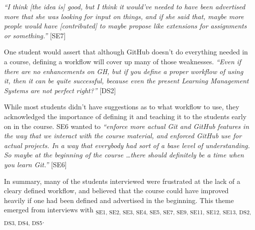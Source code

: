 \textit{``I think [the idea is] good, but I think it would've needed to have been advertised more that she was looking for input on things, and if she said that, maybe more people would have [contributed] to maybe propose like extensions for assignments or something.''} [SE7]

One student would assert that although GitHub doesn't do everything needed in a course, defining a workflow will cover up many of those weaknesses. \textit{``Even if there are no enhancements on GH, but if you define a proper workflow of using it, then it can be quite successful, because even the present Learning Management Systems are not perfect right?''} [DS2]

While most students didn't have suggestions as to what workflow to use, they acknowledged the importance of defining it and teaching it to the students early on in the course. SE6 wanted to \textit{``enforce more actual Git and GitHub features in the way that we interact with the course material, and enforced GitHub use for actual projects. In a way that everybody had sort of a base level of understanding. So maybe at the beginning of the course \ldots there should definitely be a time when you learn Git.''} [SE6]

In summary, many of the students interviewed were frustrated at the lack of a cleary defined workflow, and believed that the course could have improved heavily if one had been defined and advertised in the beginning. This theme emerged from interviews with \textsubscript{SE1, SE2, SE3, SE4, SE5, SE7, SE9, SE11, SE12, SE13, DS2, DS3, DS4, DS5}.




